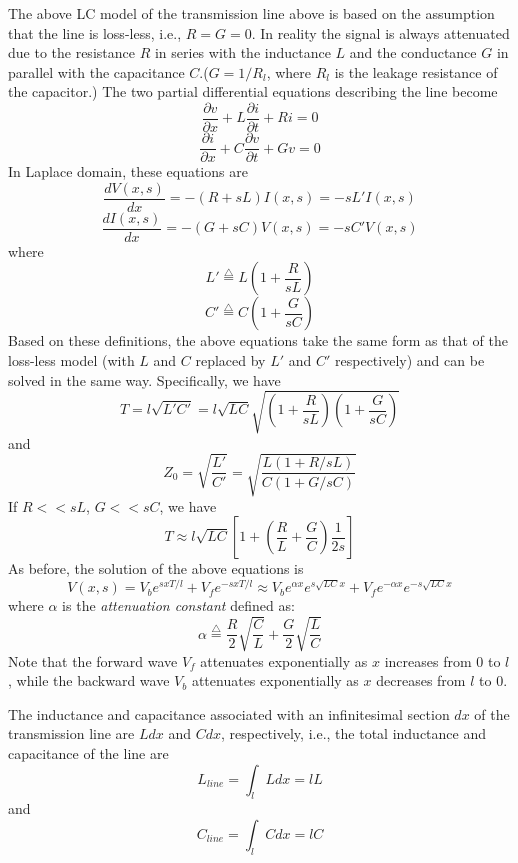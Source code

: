 The above LC model of the transmission line above is based on the 
assumption that the line is loss-less, i.e., $R=G=0$. In reality the 
signal is always attenuated due to the resistance $R$ in series with 
the inductance $L$ and the conductance $G$ in parallel with the 
capacitance $C$.($G=1/R_l$, where $R_l$ is the leakage resistance of
the capacitor.) The two partial differential equations describing the
line become
\[
\frac{\partial v}{\partial x}+L \frac{\partial i}{\partial t}+Ri=0
\]
\[
\frac{\partial i}{\partial x}+C \frac{\partial v}{\partial t}+Gv=0
\]
In Laplace domain, these equations are
\[
\frac{dV(x,s)}{dx}=-(R+sL)I(x,s)=-sL'I(x,s)
\]
\[
\frac{dI(x,s)}{dx}=-(G+sC)V(x,s)=-sC'V(x,s)
\]
where
\[	L'\stackrel{\triangle}{=}L\left(1+\frac{R}{sL}\right)	\]
\[	C'\stackrel{\triangle}{=}C\left(1+\frac{G}{sC}\right)	\]
Based on these definitions, the above equations take the same form
as that of the loss-less model (with $L$ and $C$ replaced by $L'$ and
$C'$ respectively) and can be solved in the same way. Specifically,
we have
\[
T=l\sqrt{L'C'}=l\sqrt{LC}\sqrt{\left(1+\frac{R}{sL}\right)\left(1+\frac{G}{sC}\right)}
\]
and
\[ Z_0=\sqrt{\frac{L'}{C'}}=\sqrt{\frac{L(1+R/sL)}{C(1+G/sC)}}
\]
If $R<<sL$, $G<<sC$, we have
\[ T\approx l\sqrt{LC}[1+\left(\frac{R}{L}+\frac{G}{C}\right)\frac{1}{2s}]	\]
As before, the solution of the above equations is
\[	V(x,s)=V_be^{sxT/l}+V_fe^{-sxT/l}
	\approx V_be^{\alpha x}e^{s\sqrt{LC}x}
	+V_fe^{-\alpha x}e^{-s\sqrt{LC}x}
\]
where $\alpha$ is the {\em attenuation constant} defined as:
\[
\alpha\stackrel{\triangle}{=}\frac{R}{2}\sqrt{\frac{C}{L}}+
	\frac{G}{2}\sqrt{\frac{L}{C}}
\]
Note that the forward wave $V_f$ attenuates exponentially as
$x$ increases from 0 to $l$, while the backward wave $V_b$
attenuates exponentially as $x$ decreases from $l$ to 0.







The inductance and capacitance 
associated with an infinitesimal section $dx$ of the transmission 
line are $Ldx$ and $Cdx$, respectively, i.e., the total inductance
and capacitance of the line are
\[	L_{line}=\int_l Ldx=lL	\]
and
\[	C_{line}=\int_l Cdx=lC	\]
